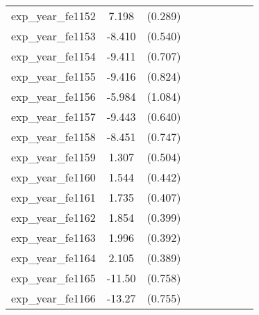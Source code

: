 {\begin{tabular}{l*{4}{cc}}
exp\_year\_fe1152&    7.198\sym{***}&  (0.289)&                  &         &                  &         &                  &         \\
exp\_year\_fe1153&   -8.410\sym{***}&  (0.540)&                  &         &                  &         &                  &         \\
exp\_year\_fe1154&   -9.411\sym{***}&  (0.707)&                  &         &                  &         &                  &         \\
exp\_year\_fe1155&   -9.416\sym{***}&  (0.824)&                  &         &                  &         &                  &         \\
exp\_year\_fe1156&   -5.984\sym{***}&  (1.084)&                  &         &                  &         &                  &         \\
exp\_year\_fe1157&   -9.443\sym{***}&  (0.640)&                  &         &                  &         &                  &         \\
exp\_year\_fe1158&   -8.451\sym{***}&  (0.747)&                  &         &                  &         &                  &         \\
exp\_year\_fe1159&    1.307\sym{**} &  (0.504)&                  &         &                  &         &                  &         \\
exp\_year\_fe1160&    1.544\sym{***}&  (0.442)&                  &         &                  &         &                  &         \\
exp\_year\_fe1161&    1.735\sym{***}&  (0.407)&                  &         &                  &         &                  &         \\
exp\_year\_fe1162&    1.854\sym{***}&  (0.399)&                  &         &                  &         &                  &         \\
exp\_year\_fe1163&    1.996\sym{***}&  (0.392)&                  &         &                  &         &                  &         \\
exp\_year\_fe1164&    2.105\sym{***}&  (0.389)&                  &         &                  &         &                  &         \\
exp\_year\_fe1165&   -11.50\sym{***}&  (0.758)&                  &         &                  &         &                  &         \\
exp\_year\_fe1166&   -13.27\sym{***}&  (0.755)&                  &         &                  &         &                  &         \\

\end{tabular}}
